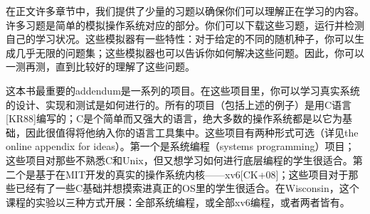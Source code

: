 在正文许多章节中，我们提供了少量的习题以确保你们可以理解正在学习的内容。许多习题是简单的模拟操作系统对应的部分。你们可以下载这些习题，运行并检测自己的学习状况。这些模拟器有一些特性：对于给定的不同的随机种子，你可以生成几乎无限的问题集；这些模拟器也可以告诉你如何解决这些问题。因此，你可以一测再测，直到比较好的理解了这些问题。

这本书最重要的addendum是一系列的项目。在这些项目里，你可以学习真实系统的设计、实现和测试是如何进行的。所有的项目（包括上述的例子）是用C语言[KR88]编写的；C是个简单而又强大的语言，绝大多数的操作系统都是以它为基础，因此很值得将他纳入你的语言工具集中。这些项目有两种形式可选（详见the online appendix for ideas）。第一个是系统编程（systems programming）项目；这些项目对那些不熟悉C和Unix，但又想学习如何进行底层编程的学生很适合。第二个是基于在MIT开发的真实的操作系统内核——xv6[CK+08]；这些项目对于那些已经有了一些C基础并想摸索进真正的OS里的学生很适合。在Wisconsin，这个课程的实验以三种方式开展：全部系统编程，或全部xv6编程，或者两者皆有。


